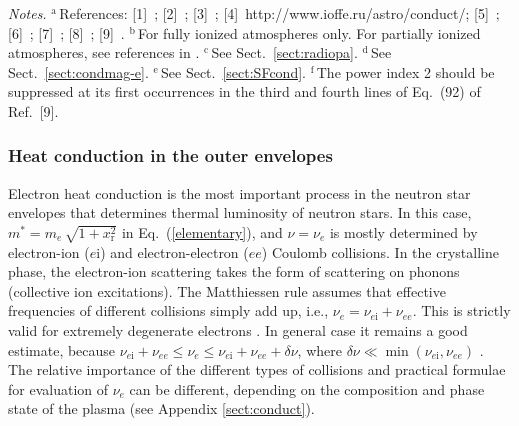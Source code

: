 \documentclass[smallextended]{svjour3}       %
\newcommand{\mel}{m_e}
\newcommand{\req}[1]{Eq.~(\ref{#1})}
\newcommand{\xr}{x_\mathrm{r}}
\begin{document}
\begin{table}[t]
\begin{center}
\end{center}
\textit{Notes.}
{}$^\mathrm{a}$\,References:
[1]~\citet{PY01};
[2]~\citet{Potekhin-ea03};
[3]~\citet{Potekhin-ea99};
[4]~http://www.ioffe.ru/astro/conduct/;
[5]~\citet{P96,P99};
[6]~\citet{GYP01};
[7]~\citet{ShterninYakovlev06};
[8]~\citet{BaikoHY01};
[9]~\citet{ShterninYakovlev07}.\hspace*{1ex}
{}$^\mathrm{b}$\,For fully ionized atmospheres only. For
partially ionized atmospheres, see references in \citet{P14}.\hspace*{1ex}
{}$^\mathrm{c}$\,See Sect.~\ref{sect:radiopa}.\hspace*{1ex}
{}$^\mathrm{d}$\,See Sect.~\ref{sect:condmag-e}.\hspace*{1ex}
{}$^\mathrm{e}$\,See Sect.~\ref{sect:SFcond}.\hspace*{1ex}
{}$^\mathrm{f}$\,The power index 2
should be suppressed at its first occurrences in the third
and fourth lines of Eq.~(92) of Ref.~[9].\vspace*{-1ex}
\label{tab:cond}
\end{table}

\subsubsection{Heat conduction in the outer envelopes}

Electron heat conduction is the most important process in
the neutron star envelopes that determines thermal
luminosity of neutron stars. In this case, $m^\ast = \mel \,
\sqrt{1+\xr^2}$ in \req{elementary}, and $\nu=\nu_e$ is mostly determined by
electron-ion ($e$i) and electron-electron ($ee$) Coulomb
collisions. In the crystalline phase, the electron-ion
scattering takes the form of scattering on phonons
(collective ion excitations). The Matthiessen rule
\citep[e.g.,][]{Ziman} assumes that effective frequencies of
different collisions simply add up, i.e.,
$\nu_e=\nu_{e\mathrm{i}}+\nu_{ee}$. This is strictly valid
for extremely degenerate electrons \citep{HubbardLampe}. In
general case it remains a good estimate, because
$\nu_{e\mathrm{i}}+\nu_{ee}\leq\nu_e\leq\nu_{e\mathrm{i}}+\nu_{ee}+\delta\nu$,
where $\delta\nu\ll\min(\nu_{e\mathrm{i}},\nu_{ee})$
\citep{Ziman}. The relative importance of the different
types of collisions and practical formulae for evaluation of
$\nu_e$ can be different, depending on the composition and
phase state of the plasma (see Appendix \ref{sect:conduct}).
\end{document}
